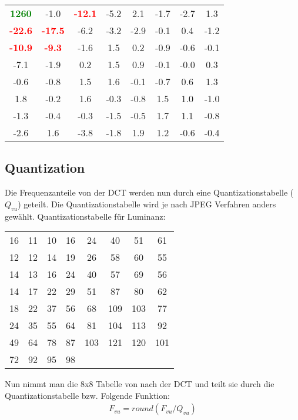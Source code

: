 \begin{center}
	\begin{tabular}{ c c c c c c c c }
		\textcolor{green}{\textbf{1260}} & -1.0                            & \textcolor{red}{\textbf{-12.1}} & -5.2 & 2.1  & -1.7 & -2.7 & 1.3  \\
		\textcolor{red}{\textbf{-22.6}}  & \textcolor{red}{\textbf{-17.5}} & -6.2                            & -3.2 & -2.9 & -0.1 & 0.4  & -1.2 \\
		\textcolor{red}{\textbf{-10.9}}  & \textcolor{red}{\textbf{-9.3}}  & -1.6                            & 1.5  & 0.2  & -0.9 & -0.6 & -0.1 \\
		-7.1                             & -1.9                            & 0.2                             & 1.5  & 0.9  & -0.1 & -0.0 & 0.3  \\
		-0.6                             & -0.8                            & 1.5                             & 1.6  & -0.1 & -0.7 & 0.6  & 1.3  \\
		1.8                              & -0.2                            & 1.6                             & -0.3 & -0.8 & 1.5  & 1.0  & -1.0 \\
		-1.3                             & -0.4                            & -0.3                            & -1.5 & -0.5 & 1.7  & 1.1  & -0.8 \\
		-2.6                             & 1.6                             & -3.8                            & -1.8 & 1.9  & 1.2  & -0.6 & -0.4 \\
	\end{tabular}
\end{center}
\subsection{Quantization}
Die Frequenzanteile von der DCT werden nun durch eine Quantizationstabelle ($Q_{vu}$) geteilt. Die Quantizationstabelle
wird je nach JPEG Verfahren anders gewählt. Quantizationstabelle für Luminanz:
\begin{center}
	\begin{tabular}{ c c c c c c c c }
		16 & 11 & 10 & 16 & 24  & 40  & 51  & 61  \\
		12 & 12 & 14 & 19 & 26  & 58  & 60  & 55  \\
		14 & 13 & 16 & 24 & 40  & 57  & 69  & 56  \\
		14 & 17 & 22 & 29 & 51  & 87  & 80  & 62  \\
		18 & 22 & 37 & 56 & 68  & 109 & 103 & 77  \\
		24 & 35 & 55 & 64 & 81  & 104 & 113 & 92  \\
		49 & 64 & 78 & 87 & 103 & 121 & 120 & 101 \\
		72 & 92 & 95 & 98 &
	\end{tabular}
\end{center}
Nun nimmt man die 8x8 Tabelle von nach der DCT und teilt sie durch die Quantizationstabelle bzw.
Folgende Funktion:
\begin{align*}
	F_{vu} = round(F_{vu}/Q_{vu})
\end{align*}

